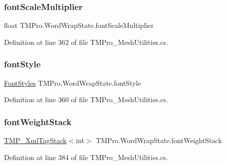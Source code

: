 \mbox{\label{struct_t_m_pro_1_1_word_wrap_state_afbd655b9a72d1a17996f72ddc1701d59}} 
\subsubsection{\texorpdfstring{fontScaleMultiplier}{fontScaleMultiplier}}
{\footnotesize\ttfamily float T\+M\+Pro.\+Word\+Wrap\+State.\+font\+Scale\+Multiplier}



Definition at line 362 of file T\+M\+Pro\+\_\+\+Mesh\+Utilities.\+cs.

\mbox{\label{struct_t_m_pro_1_1_word_wrap_state_a52af8f77eb6929797cdf0251a3f5951d}} 
\subsubsection{\texorpdfstring{fontStyle}{fontStyle}}
{\footnotesize\ttfamily \mbox{\hyperlink{namespace_t_m_pro_aedf79b6e7e2ce2b9c9ac84e790596e7c}{Font\+Styles}} T\+M\+Pro.\+Word\+Wrap\+State.\+font\+Style}



Definition at line 360 of file T\+M\+Pro\+\_\+\+Mesh\+Utilities.\+cs.

\mbox{\label{struct_t_m_pro_1_1_word_wrap_state_aab638c6b73c66561dfabffe5b9c893f2}} 
\subsubsection{\texorpdfstring{fontWeightStack}{fontWeightStack}}
{\footnotesize\ttfamily \mbox{\hyperlink{struct_t_m_pro_1_1_t_m_p___xml_tag_stack}{T\+M\+P\+\_\+\+Xml\+Tag\+Stack}}$<$int$>$ T\+M\+Pro.\+Word\+Wrap\+State.\+font\+Weight\+Stack}



Definition at line 384 of file T\+M\+Pro\+\_\+\+Mesh\+Utilities.\+cs.

